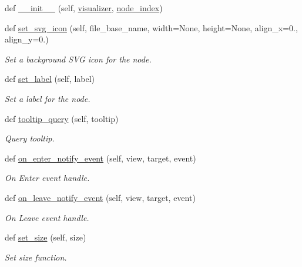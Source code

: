 \begin{DoxyCompactItemize}
\item 
def \hyperlink{classvisualizer_1_1core_1_1Node_a9166e3e6f9f460f514ba9d36d2ef50c7}{\+\_\+\+\_\+init\+\_\+\+\_\+} (self, \hyperlink{classvisualizer_1_1core_1_1Node_a0a496e48f933bd1b1abb6bfaf0c35697}{visualizer}, \hyperlink{classvisualizer_1_1core_1_1Node_aea81fec6a912dca8f7c389ed7cb37008}{node\+\_\+index})
\item 
def \hyperlink{classvisualizer_1_1core_1_1Node_a308c7317a292873bfeb648b1ca1a839e}{set\+\_\+svg\+\_\+icon} (self, file\+\_\+base\+\_\+name, width=None, height=None, align\+\_\+x=0., align\+\_\+y=0.)
\begin{DoxyCompactList}\small\item\em Set a background S\+VG icon for the node. \end{DoxyCompactList}\item 
def \hyperlink{classvisualizer_1_1core_1_1Node_a2af5df5a7ac732941d9f4091fbec2e2e}{set\+\_\+label} (self, label)
\begin{DoxyCompactList}\small\item\em Set a label for the node. \end{DoxyCompactList}\item 
def \hyperlink{classvisualizer_1_1core_1_1Node_adc2fb79db11c7bc14798dd8459400950}{tooltip\+\_\+query} (self, tooltip)
\begin{DoxyCompactList}\small\item\em Query tooltip. \end{DoxyCompactList}\item 
def \hyperlink{classvisualizer_1_1core_1_1Node_a094a76fc571b4ae5ba76c3bd2d8d9b3b}{on\+\_\+enter\+\_\+notify\+\_\+event} (self, view, target, event)
\begin{DoxyCompactList}\small\item\em On Enter event handle. \end{DoxyCompactList}\item 
def \hyperlink{classvisualizer_1_1core_1_1Node_a5b53da968c768c6dace69557dffeeb3e}{on\+\_\+leave\+\_\+notify\+\_\+event} (self, view, target, event)
\begin{DoxyCompactList}\small\item\em On Leave event handle. \end{DoxyCompactList}\item 
def \hyperlink{classvisualizer_1_1core_1_1Node_ae3c935cc239df56943eb4a731511500c}{set\+\_\+size} (self, size)
\begin{DoxyCompactList}\small\item\em Set size function. \end{DoxyCompactList}\item 

\end{DoxyCompactItemize}
